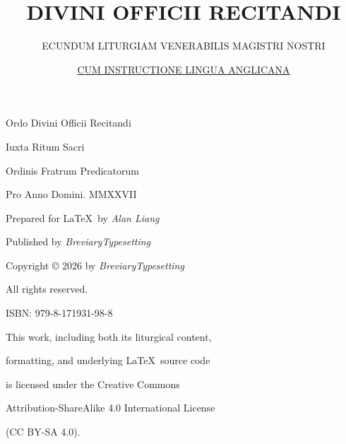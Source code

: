 \documentclass[openany]{book}
\title{\mdseries \fontsize{20}{16}\selectfont \color{Red} DIVINI OFFICII RECITANDI \\ \vspace{+.5em}}
\author{\normalsize \color{black} \mdseries {S}ECUNDUM {L}ITURGIAM {V}ENERABILIS {M}AGISTRI {N}OSTRI \\ \vspace{+.75em}}
\date{\large \color{black} \underline{\color{Red} CUM INSTRUCTIONE LINGUA ANGLICANA} \\ \vspace{+.5em}}
\renewcommand{\\}{\par\hspace*{.25em}} %
\renewcommand{\newline}{\par}
\begin{document}
\fontsize{9pt}{11pt}\selectfont %

\frontmatter

\maketitle

\clearpage
{}
\thispagestyle{empty}


\vspace{+7em}
\begin{center}
\large
Ordo Divini Officii Recitandi
\newline Iuxta Ritum Sacri
\newline Ordinis Fratrum Predicatorum
\newline Pro Anno Domini. MMXXVII
\end{center}
\begin{center}

\end{center}
\begin{center}

\newline Prepared for \LaTeX \ by \emph{Alan Liang}
\end{center}
\begin{center}

\newline Published by \emph{BreviaryTypesetting}
\end{center}
\begin{center}

\newline Copyright © 2026 by \emph{BreviaryTypesetting}
\newline All rights reserved.
\end{center}
\begin{center}


\newline ISBN: 979-8-171931-98-8
\end{center}
\begin{center}


This work, including both its liturgical content,
\newline formatting, and underlying \LaTeX \ source code
\newline is licensed under the Creative Commons
\newline Attribution-ShareAlike 4.0 International License
\newline (CC BY-SA 4.0).
\end{center}
\end{document}
